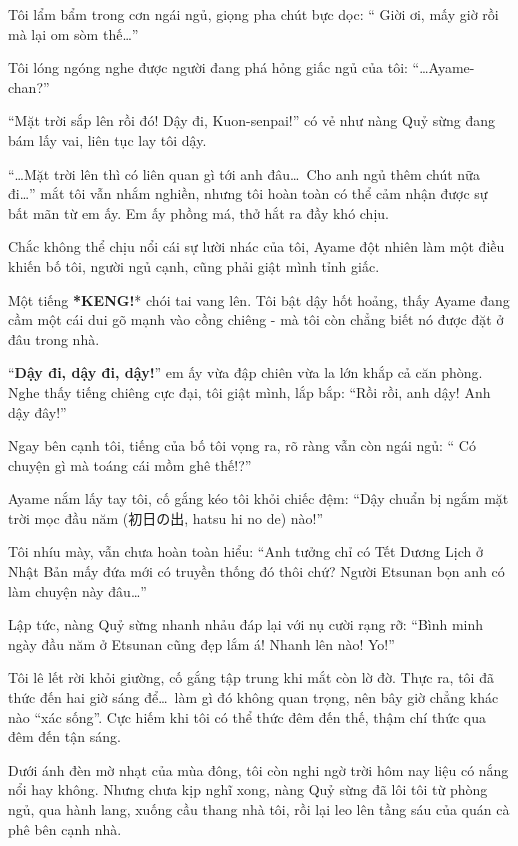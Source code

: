 \documentclass[../main.tex]{subfiles}
\begin{document}
Tôi lẩm bẩm trong cơn ngái ngủ, giọng pha chút bực dọc: ``{\color{red} Giời ơi, mấy giờ rồi mà lại om sòm thế\dots}''

Tôi lóng ngóng nghe được người đang phá hỏng giấc ngủ của tôi: ``\dots Ayame-chan?''

``Mặt trời sắp lên rồi đó! Dậy đi, Kuon-senpai!'' có vẻ như nàng Quỷ sừng đang bám lấy vai, liên tục lay tôi dậy.

``\dots Mặt trời lên thì có liên quan gì tới anh đâu\dots\ Cho anh ngủ thêm chút nữa đi\dots'' mắt tôi vẫn nhắm nghiền, nhưng tôi hoàn toàn có thể cảm nhận được sự bất mãn từ em ấy. Em ấy phồng má, thở hắt ra đầy khó chịu.

Chắc không thể chịu nổi cái sự lười nhác của tôi, Ayame đột nhiên làm một điều khiến bố tôi, người ngủ cạnh, cũng phải giật mình tỉnh giấc.

Một tiếng \textbf{*KENG!}* chói tai vang lên. Tôi bật dậy hốt hoảng, thấy Ayame đang cầm một cái dui gõ mạnh vào cồng chiêng - mà tôi còn chẳng biết nó được đặt ở đâu trong nhà.

``\textbf{Dậy đi, dậy đi, dậy!}'' em ấy vừa đập chiên vừa la lớn khắp cả căn phòng. Nghe thấy tiếng chiêng cực đại, tôi giật mình, lắp bắp: ``Rồi rồi, anh dậy! Anh dậy đây!''

Ngay bên cạnh tôi, tiếng của bố tôi vọng ra, rõ ràng vẫn còn ngái ngủ: ``{\color{red} Có chuyện gì mà toáng cái mồm ghê thế!?}''

Ayame nắm lấy tay tôi, cố gắng kéo tôi khỏi chiếc đệm: ``Dậy chuẩn bị ngắm mặt trời mọc đầu năm (初日の出, hatsu hi no de) nào!''

Tôi nhíu mày, vẫn chưa hoàn toàn hiểu: ``Anh tưởng chỉ có Tết Dương Lịch ở Nhật Bản mấy đứa mới có truyền thống đó thôi chứ? Người Etsunan bọn anh có làm chuyện này đâu\dots''

Lập tức, nàng Quỷ sừng nhanh nhảu đáp lại với nụ cười rạng rỡ: ``Bình minh ngày đầu năm ở Etsunan cũng đẹp lắm á! Nhanh lên nào! Yo!''

Tôi lê lết rời khỏi giường, cố gắng tập trung khi mắt còn lờ đờ. Thực ra, tôi đã thức đến hai giờ sáng để\dots\ làm gì đó không quan trọng, nên bây giờ chẳng khác nào ``xác sống''. Cực hiếm khi tôi có thể thức đêm đến thế, thậm chí thức qua đêm đến tận sáng.

Dưới ánh đèn mờ nhạt của mùa đông, tôi còn nghi ngờ trời hôm nay liệu có nắng nổi hay không. Nhưng chưa kịp nghĩ xong, nàng Quỷ sừng đã lôi tôi từ phòng ngủ, qua hành lang, xuống cầu thang nhà tôi, rồi lại leo lên tầng sáu của quán cà phê bên cạnh nhà.
\end{document}
